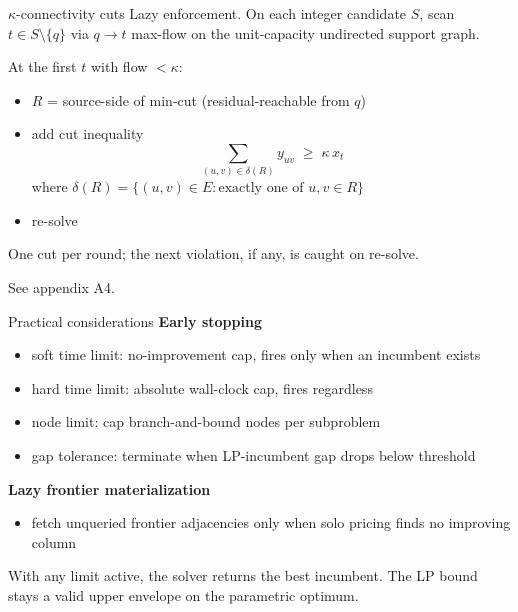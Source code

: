 \documentclass{beamer}
\begin{document}
\begin{frame}{$\kappa$-connectivity cuts}
  Lazy enforcement. On each integer candidate $S$, scan $t \in S \setminus \{q\}$ via $q \to t$ max-flow on the unit-capacity undirected support graph.

  \vfill

  At the first $t$ with flow $< \kappa$:
  \begin{itemize}
    \item $R$ = source-side of min-cut (residual-reachable from $q$)
    \item add cut inequality
          \[
            \sum_{(u,v) \in \delta(R)} y_{uv} \;\ge\; \kappa \, x_t
          \]
          where $\delta(R) = \{(u,v) \in E : \text{exactly one of } u, v \in R\}$
    \item re-solve
  \end{itemize}

  \vfill

  One cut per round; the next violation, if any, is caught on re-solve.

  \vfill

  \footnotesize See appendix A4.
\end{frame}

\begin{frame}{Practical considerations}
  \textbf{Early stopping}
  \begin{itemize}
    \item soft time limit: no-improvement cap, fires only when an incumbent exists
    \item hard time limit: absolute wall-clock cap, fires regardless
    \item node limit: cap branch-and-bound nodes per subproblem
    \item gap tolerance: terminate when LP-incumbent gap drops below threshold
  \end{itemize}

  \vfill

  \textbf{Lazy frontier materialization}
  \begin{itemize}
    \item fetch unqueried frontier adjacencies only when solo pricing finds no improving column
  \end{itemize}

  \vfill

  With any limit active, the solver returns the best incumbent. The LP bound stays a valid upper envelope on the parametric optimum.
\end{frame}
\end{document}
